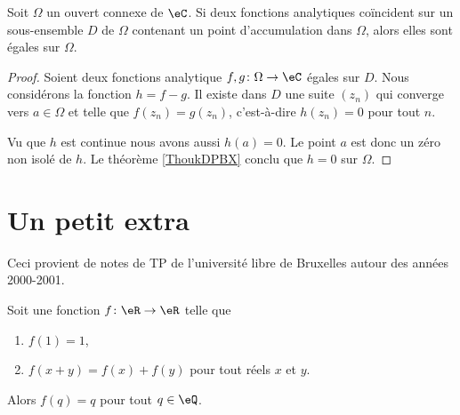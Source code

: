 \begin{theorem}\label{ThoAVBCewB}
	Soit \( \Omega\) un ouvert connexe de \( \eC\). Si deux fonctions analytiques coïncident sur un sous-ensemble \( D\) de \( \Omega\) contenant un point d'accumulation dans \( \Omega\), alors elles sont égales sur \( \Omega\).
\end{theorem}

\begin{proof}
	Soient deux fonctions analytique \( f,g\colon \Omega\to \eC\) égales sur \( D\). Nous considérons la fonction \( h=f-g\). Il existe dans \( D\) une suite \( (z_n)\) qui converge vers \( a\in \Omega\) et telle que \( f(z_n)=g(z_n)\), c'est-à-dire \( h(z_n)=0\) pour tout \( n\).

	Vu que \( h\) est continue nous avons aussi \( h(a)=0\). Le point \( a\) est donc un zéro non isolé de \( h\). Le théorème \ref{ThoukDPBX} conclu que \( h=0\) sur \( \Omega\).
\end{proof}

\section{Un petit extra}

Ceci provient de notes de TP de l'université libre de Bruxelles autour des années 2000-2001\cite{BIBooFYVSooNIiApF}. 


\begin{lemma}        \label{LEMooXRMAooRADhOM}
    Soit une fonction \( f\colon \eR\to \eR\) telle que
    \begin{enumerate}

        \item		\label{ItemExtrai}
            \( f(1)=1\),

        \item		\label{ItemExtraii}
            \( f(x+y)=f(x)+f(y)\) pour tout réels \( x\) et \( y\).
    \end{enumerate}
    Alors \( f(q)=q\) pour tout \( q\in \eQ\).
\end{lemma}

